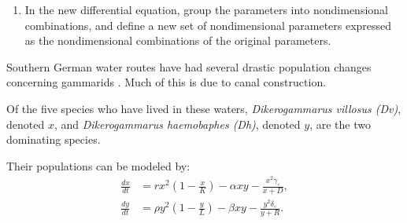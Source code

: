 \documentclass[landscape,final,a0paper,fontscale=0.285]{baposter}
\begin{document}
\begin{poster}
{\begin{center}
\begin{enumerate}
\item 
	In the new differential equation, group the parameters into nondimensional combinations, and define a new set of nondimensional parameters expressed as the nondimensional combinations of the original parameters.
	 
\end{enumerate}
\end{center}
}

{
Southern German water routes have had several drastic population
changes concerning gammarids \cite{Dikerogammarus}. Much of this is due to canal construction.

 Of the five species who have lived in these waters, \textit{Dikerogammarus villosus (Dv)}, denoted $x$, and \textit{Dikerogammarus haemobaphes (Dh)}, denoted $y$, are the two dominating species. 

Their populations can be modeled by:
   \begin{align*}
    \frac{dx}{dt} & = rx^2 \left(1-\frac{x}{K}\right) - \alpha xy - \frac{x^2 \gamma_\circ}{x+D}, \\
    \frac{dy}{dt} & = \rho y^2 \left(1-\frac{y}{L}\right) - \beta xy -\frac{y^2 \delta_\circ}{y+R}.
  \end{align*}
	
}




\end{poster}
\end{document}

